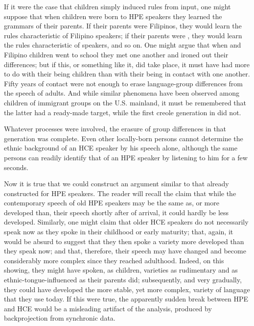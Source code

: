 If it were the case that children simply induced rules from input, one might suppose that when children were born to HPE speakers they learned the grammars of their parents. If their parents were Filipinos, they would learn the rules characteristic of Filipino speakers; if their parents were , they would learn the rules characteristic of  speakers, and so on. One might argue that when  and Filipino children went to school they met one another and ironed out their differences; but if this, or something like it, did take place, it must have had more to do with their being children than with their being in contact with one another. Fifty years of contact were not enough to erase language-group differences from the speech of adults. And while similar phenomena have been observed among children of immigrant groups on the U.S. mainland, it must be remembered that the latter had a ready-made target, while the first creole generation in  did not.

Whatever processes were involved, the erasure of group differences in that generation was complete. Even other locally-born persons cannot determine the ethnic background of an HCE speaker by his speech alone, although the same persons can readily identify that of an HPE speaker by listening to him for a few seconds.

Now it is true that we could construct an argument similar to that already constructed for HPE speakers. The reader will recall the claim that while the contemporary speech of old HPE speakers may be the same as, or more developed than, their speech shortly after  of
arrival, it could hardly be less developed. Similarly, one might claim that older HCE speakers do not necessarily speak now as they spoke in their childhood or early maturity; that, again, it would be absurd to suggest that they then spoke a variety more developed than they speak now; and that, therefore, their speech may have changed and become considerably more complex since they reached adulthood. Indeed, on this showing, they might have spoken, as children, varieties as rudimentary and as ethnic-tongue-influenced as their parents did; subsequently, and very gradually, they could have developed the more stable, yet more complex, variety of language that they use today. If this were true, the apparently sudden break between HPE and HCE would be a misleading artifact of the analysis, produced by back\-projection from synchronic data.

